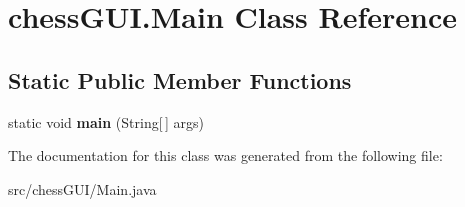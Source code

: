 \hypertarget{classchess_g_u_i_1_1_main}{}\section{chess\+G\+U\+I.\+Main Class Reference}
\label{classchess_g_u_i_1_1_main}
\subsection*{Static Public Member Functions}
\begin{DoxyCompactItemize}
\item 
\mbox{\label{classchess_g_u_i_1_1_main_a83bcd8a2ccca303fcda6c66019f3b543}} 
static void {\bfseries main} (String\mbox{[}$\,$\mbox{]} args)
\end{DoxyCompactItemize}


The documentation for this class was generated from the following file\+:\begin{DoxyCompactItemize}
\item 
src/chess\+G\+U\+I/Main.\+java\end{DoxyCompactItemize}
